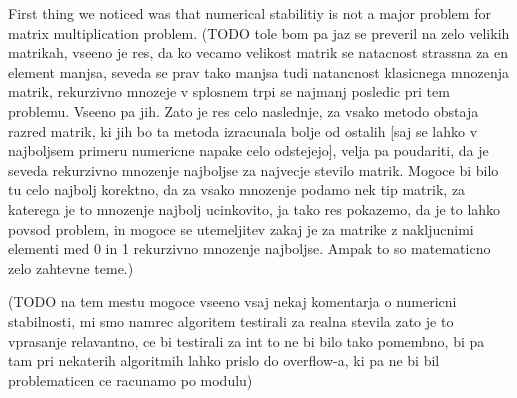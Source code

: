 \documentclass[a4paper,11pt]{article}
\begin{document}
First thing we noticed was that numerical stabilitiy is not a major problem for matrix multiplication problem.
(TODO tole bom pa jaz se preveril na zelo velikih matrikah, 
vseeno je res, da ko vecamo velikost matrik se natacnost strassna za en element manjsa, seveda se prav tako manjsa tudi natancnost klasicnega mnozenja matrik, rekurzivno mnozeje v splosnem trpi se najmanj posledic pri tem problemu. Vseeno pa jih. Zato je res celo naslednje, za vsako metodo obstaja razred matrik, ki jih bo ta metoda izracunala bolje od ostalih [saj se lahko v najboljsem primeru numericne napake celo odstejejo], velja pa poudariti, da je seveda rekurzivno mnozenje najboljse za najvecje stevilo matrik. 
Mogoce bi bilo tu celo najbolj korektno, da za vsako mnozenje podamo nek tip matrik, za katerega je to mnozenje najbolj ucinkovito, 
ja tako res pokazemo, da je to lahko povsod problem, in mogoce se utemeljitev zakaj je za matrike z nakljucnimi elementi med 0 in 1 rekurzivno mnozenje najboljse.
Ampak to so matematicno zelo zahtevne teme.)

(TODO na tem mestu mogoce vseeno vsaj nekaj komentarja o numericni stabilnosti, mi smo namrec algoritem testirali za realna stevila zato je to vprasanje relavantno, ce bi testirali za int to ne bi bilo tako pomembno, bi pa tam pri nekaterih algoritmih lahko prislo do overflow-a, ki pa ne bi bil problematicen ce racunamo po modulu)

\end{document}
